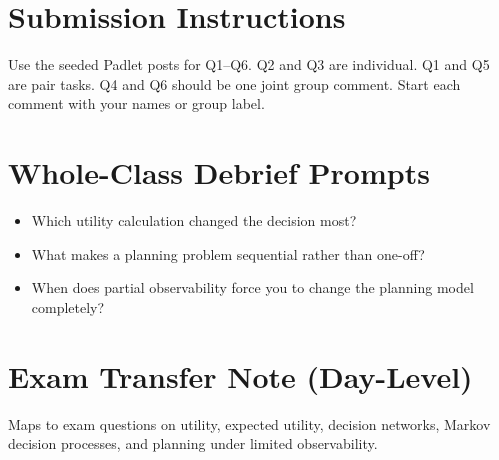 \documentclass[11pt]{article}
\providecommand{\tightlist}{\setlength{\itemsep}{0pt}\setlength{\parskip}{0pt}}
\begin{document}
\section*{Submission Instructions}

Use the seeded Padlet posts for Q1--Q6. Q2 and Q3 are individual. Q1 and Q5 are pair tasks. Q4 and Q6 should be one joint group comment. Start each comment with your names or group label.

\section*{Whole-Class Debrief Prompts}

\begin{itemize}
\tightlist
\item
  Which utility calculation changed the decision most?
\item
  What makes a planning problem sequential rather than one-off?
\item
  When does partial observability force you to change the planning model completely?
\end{itemize}

\section*{Exam Transfer Note (Day-Level)}

Maps to exam questions on utility, expected utility, decision networks, Markov decision processes, and planning under limited observability.
\end{document}
